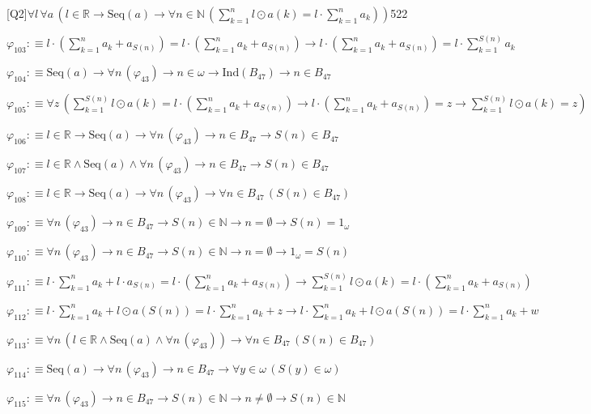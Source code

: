 \begin{fullproof}{[Q2]}{$\forall l\,\forall a\,(l \in \mathbb{R} \to \mathrm{Seq}(a) \to \forall n \in \mathbb{N}\,({\textstyle\sum_{k=1}^{n} l \odot a(k)} = l \cdot {\textstyle\sum_{k=1}^{n} a_{k}}))$}{522}
\begin{abbrevlist}
\item $\varphi_{103} :\equiv l \cdot ({\textstyle\sum_{k=1}^{n} a_{k}} + a_{S(n)}) = l \cdot ({\textstyle\sum_{k=1}^{n} a_{k}} + a_{S(n)}) \to l \cdot ({\textstyle\sum_{k=1}^{n} a_{k}} + a_{S(n)}) = l \cdot {\textstyle\sum_{k=1}^{S(n)} a_{k}}$
\item $\varphi_{104} :\equiv \mathrm{Seq}(a) \to \forall n\,(\varphi_{43}) \to n \in \omega \to \mathrm{Ind}(B_{47}) \to n \in B_{47}$
\item $\varphi_{105} :\equiv \forall z\,({\textstyle\sum_{k=1}^{S(n)} l \odot a(k)} = l \cdot ({\textstyle\sum_{k=1}^{n} a_{k}} + a_{S(n)}) \to l \cdot ({\textstyle\sum_{k=1}^{n} a_{k}} + a_{S(n)}) = z \to {\textstyle\sum_{k=1}^{S(n)} l \odot a(k)} = z)$
\item $\varphi_{106} :\equiv l \in \mathbb{R} \to \mathrm{Seq}(a) \to \forall n\,(\varphi_{43}) \to n \in B_{47} \to S(n) \in B_{47}$
\item $\varphi_{107} :\equiv l \in \mathbb{R} \land \mathrm{Seq}(a) \land \forall n\,(\varphi_{43}) \to n \in B_{47} \to S(n) \in B_{47}$
\item $\varphi_{108} :\equiv l \in \mathbb{R} \to \mathrm{Seq}(a) \to \forall n\,(\varphi_{43}) \to \forall n \in B_{47}\,(S(n) \in B_{47})$
\item $\varphi_{109} :\equiv \forall n\,(\varphi_{43}) \to n \in B_{47} \to S(n) \in \mathbb{N} \to n = \emptyset \to S(n) = 1_{\omega}$
\item $\varphi_{110} :\equiv \forall n\,(\varphi_{43}) \to n \in B_{47} \to S(n) \in \mathbb{N} \to n = \emptyset \to 1_{\omega} = S(n)$
\item $\varphi_{111} :\equiv l \cdot {\textstyle\sum_{k=1}^{n} a_{k}} + l \cdot a_{S(n)} = l \cdot ({\textstyle\sum_{k=1}^{n} a_{k}} + a_{S(n)}) \to {\textstyle\sum_{k=1}^{S(n)} l \odot a(k)} = l \cdot ({\textstyle\sum_{k=1}^{n} a_{k}} + a_{S(n)})$
\item $\varphi_{112} :\equiv l \cdot {\textstyle\sum_{k=1}^{n} a_{k}} + l \odot a(S(n)) = l \cdot {\textstyle\sum_{k=1}^{n} a_{k}} + z \to l \cdot {\textstyle\sum_{k=1}^{n} a_{k}} + l \odot a(S(n)) = l \cdot {\textstyle\sum_{k=1}^{n} a_{k}} + w$
\item $\varphi_{113} :\equiv \forall n\,(l \in \mathbb{R} \land \mathrm{Seq}(a) \land \forall n\,(\varphi_{43})) \to \forall n \in B_{47}\,(S(n) \in B_{47})$
\item $\varphi_{114} :\equiv \mathrm{Seq}(a) \to \forall n\,(\varphi_{43}) \to n \in B_{47} \to \forall y \in \omega\,(S(y) \in \omega)$
\item $\varphi_{115} :\equiv \forall n\,(\varphi_{43}) \to n \in B_{47} \to S(n) \in \mathbb{N} \to n \neq \emptyset \to S(n) \in \mathbb{N}$

\end{abbrevlist}
\end{fullproof}
